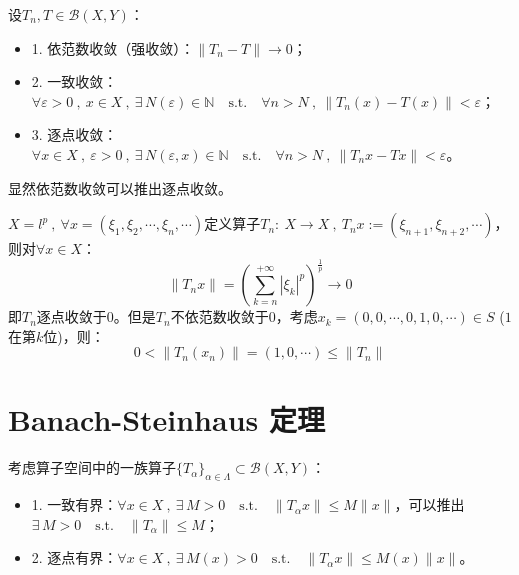 \begin{definition}[算子空间中的收敛]
设$T_n,T \in \mathscr{B}(X,Y)$：
\begin{itemize}
\item 1. 依范数收敛（强收敛）：$\|T_n-T\| \to 0$；
\item 2. 一致收敛：$\forall \varepsilon>0 \ , \ x \in X \ , \ \exists \, N(\varepsilon) \in \mathbb{N} \quad \text{s.t.} \quad \forall n>N \ , \ \|T_n(x)-T(x)\|<\varepsilon$；
\item 3. 逐点收敛：$\forall x \in X \ , \ \varepsilon>0 \ , \ \exists \, N(\varepsilon,x) \in \mathbb{N} \quad \text{s.t.} \quad \forall n>N \ , \ \|T_nx-Tx\|<\varepsilon$。
\end{itemize}
\end{definition}
显然依范数收敛可以推出逐点收敛。
\begin{example}
\quad $X=l^p \ , \ \forall x=(\xi_1,\xi_2,\cdots,\xi_n,\cdots)$定义算子$T_n: \ X \to X \ , \ T_nx:=(\xi_{n+1},\xi_{n+2},\cdots)$，则对$\forall x \in X$：
\[\|T_nx\|=\left(\sum_{k=n}^{+\infty}|\xi_k|^p\right)^{\frac{1}{p}} \to 0\]
即$T_n$逐点收敛于$0$。但是$T_n$不依范数收敛于$0$，考虑$x_k=(0,0,\cdots,0,1,0,\cdots) \in S$ ($1$在第$k$位)，则：
\[0 < \|T_n(x_n)\|=(1,0,\cdots) \leq \|T_n\|\]
\end{example}

\section{Banach-Steinhaus 定理}
\begin{definition}[算子有界性]
考虑算子空间中的一族算子$\{T_{\alpha}\}_{\alpha \in \Lambda} \subset \mathscr{B}(X,Y)$：
\begin{itemize}
\item 1. 一致有界：$\forall x \in X \ , \ \exists \, M>0 \quad \text{s.t.} \quad \|T_{\alpha}x\| \leq M\|x\|$，可以推出$\exists \, M>0 \quad \text{s.t.} \quad \|T_{\alpha}\| \leq M$；
\item 2. 逐点有界：$\forall x \in X \ , \ \exists \, M(x)>0 \quad \text{s.t.} \quad \|T_{\alpha}x\| \leq M(x)\|x\|$。
\end{itemize}
\end{definition}

